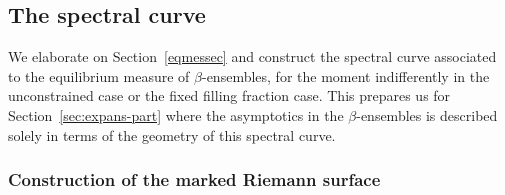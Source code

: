 \documentclass[10pt,a4paper]{amsart}
\numberwithin{equation}{section}
\begin{document}
\subsection{The spectral curve}

We elaborate on Section~\ref{eqmessec} and construct the spectral curve associated to the equilibrium measure of ${\beta}$-ensembles, for the moment indifferently in the unconstrained case or the fixed filling fraction case. This prepares us for Section~\ref{sec:expans-part} where the asymptotics in the $\beta$-ensembles is described solely in terms of the geometry of this spectral curve.

\subsubsection{Construction of the marked Riemann surface}
\label{sec:constr-spectr-curve}
\end{document}
